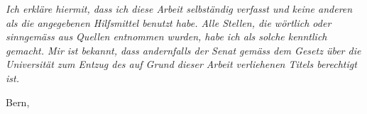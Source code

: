 \vspace*{0cm}
\vfill
\noindent\parbox[b][0.5\textheight]{\textwidth}
{
		\vfill
		\noindent\normalsize\mdseries\itshape
Ich erkläre hiermit, dass ich diese Arbeit selbständig verfasst und keine anderen als die angegebenen Hilfsmittel benutzt habe. Alle Stellen, die wörtlich oder sinngemäss aus Quellen entnommen wurden, habe ich als solche kenntlich gemacht. Mir ist bekannt, dass andernfalls der Senat gemäss dem Gesetz über die Universität zum Entzug des auf Grund dieser Arbeit verliehenen Titels berechtigt ist.\par
		\vspace{2cm}
		\noindent\normalsize\normalfont
		{
			Bern, \thedate\par
		}\par
		\vspace{2cm}
		\noindent\normalsize\normalfont
		{
			\theauthor\par
		}\par
}\par
